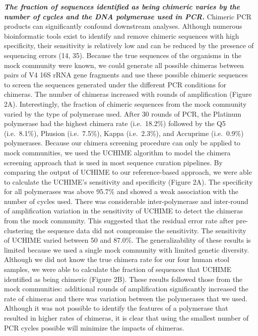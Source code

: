 \documentclass[11pt,]{article}
\begin{document}
\textbf{\emph{The fraction of sequences identified as being chimeric
varies by the number of cycles and the DNA polymerase used in PCR.}}
Chimeric PCR products can significantly confound downstream analyses.
Although numerous bioinformatic tools exist to identify and remove
chimeric sequences with high specificity, their sensitivity is
relatively low and can be reduced by the presence of sequencing errors
(14, 35). Because the true sequences of the organisms in the mock
community were known, we could generate all possible chimeras between
pairs of V4 16S rRNA gene fragments and use these possible chimeric
sequences to screen the sequences generated under the different PCR
conditions for chimeras. The number of chimeras increased with rounds of
amplification (Figure 2A). Interestingly, the fraction of chimeric
sequences from the mock community varied by the type of polymerase used.
After 30 rounds of PCR, the Platinum polymerase had the highest chimera
rate (i.e.~18.2\%) followed by the Q5 (i.e.~8.1\%), Phusion
(i.e.~7.5\%), Kappa (i.e.~2.3\%), and Accuprime (i.e.~0.9\%)
polymerases. Because our chimera screening procedure can only be applied
to mock communities, we used the UCHIME algorithm to model the chimera
screening approach that is used in most sequence curation pipelines. By
comparing the output of UCHIME to our reference-based approach, we were
able to calculate the UCHIME's sensitivity and specificity (Figure 2A).
The specificity for all polymerases was above 95.7\% and showed a weak
association with the number of cycles used. There was considerable
inter-polymerase and inter-round of amplification variation in the
sensitivity of UCHIME to detect the chimeras from the mock community.
This suggested that the residual error rate after pre-clustering the
sequence data did not compromise the sensitivity. The sensitivity of
UCHIME varied between 50 and 87.0\%. The generalizability of these
results is limited because we used a single mock community with limited
genetic diversity. Although we did not know the true chimera rate for
our four human stool samples, we were able to calculate the fraction of
sequences that UCHIME identified as being chimeric (Figure 2B). These
results followed those from the mock communities: additional rounds of
amplification significantly increased the rate of chimeras and there was
variation between the polymerases that we used. Although it was not
possible to identify the features of a polymerase that resulted in
higher rates of chimeras, it is clear that using the smallest number of
PCR cycles possible will minimize the impacts of chimeras.
\end{document}
